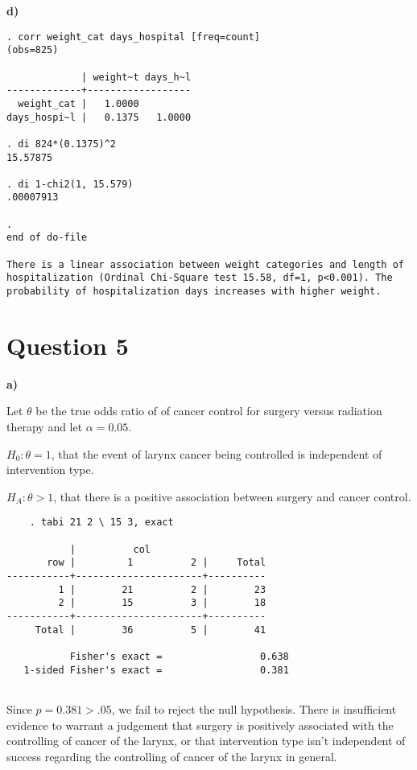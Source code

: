 \documentclass{article}
\begin{document}
\textbf{d)}

\begin{verbatim}
. corr weight_cat days_hospital [freq=count]
(obs=825)

             | weight~t days_h~l
-------------+------------------
  weight_cat |   1.0000
days_hospi~l |   0.1375   1.0000

. di 824*(0.1375)^2
15.57875

. di 1-chi2(1, 15.579)
.00007913

. 
end of do-file

There is a linear association between weight categories and length of hospitalization (Ordinal Chi-Square test 15.58, df=1, p<0.001). The probability of hospitalization days increases with higher weight.

\end{verbatim}


\section*{Question 5}

\textbf{a)}

Let $\theta$ be the true odds ratio of of cancer control for surgery versus radiation therapy and let $\alpha=0.05$.

$H_0: \theta = 1$, that the event of larynx cancer being controlled is independent of intervention type.

$H_A: \theta > 1$, that there is a positive association between surgery and cancer control.

\begin{verbatim}
    . tabi 21 2 \ 15 3, exact

           |          col
       row |         1          2 |     Total
-----------+----------------------+----------
         1 |        21          2 |        23 
         2 |        15          3 |        18 
-----------+----------------------+----------
     Total |        36          5 |        41 

           Fisher's exact =                 0.638
   1-sided Fisher's exact =                 0.381
   
\end{verbatim}

Since $p=0.381 > .05$, we fail to reject the null hypothesis. There is insufficient evidence to warrant a judgement that surgery is positively associated with the controlling of cancer of the larynx, or that intervention type isn't independent of success regarding the controlling of cancer of the larynx in general.
\end{document}
